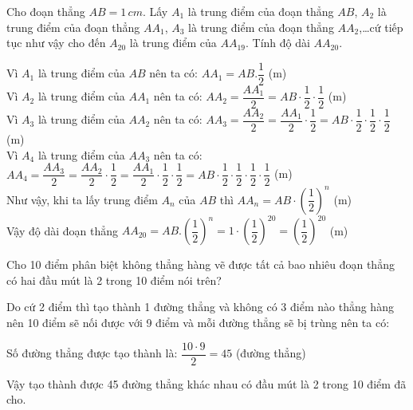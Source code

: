 \begin{bt}
	Cho đoạn thẳng $AB=1\,cm$. Lấy ${{A}_{1}}$ là trung điểm của đoạn thẳng $AB$, ${{A}_{2}}$ là trung điểm của đoạn thẳng $A{{A}_{1}}$, ${{A}_{3}}$ là trung điểm của đoạn thẳng $A{{A}_{2}}$,\ldots cứ tiếp tục như vậy cho đến ${{A}_{20}}$ là trung điểm của $A{{A}_{19}}$. Tính độ dài $A{{A}_{20}}$.
	\begin{loigiaichuong29}
		Vì ${{A}_{1}}$ là trung điểm của $AB$ nên ta có: $A{{A}_{1}}=AB.\dfrac{1}{2}$ (m)\\
		Vì ${{A}_{2}}$ là trung điểm của $A{{A}_{1}}$ nên ta có: $A{{A}_{2}}=\dfrac{A{{A}_{1}}}{2}=AB\cdot\dfrac{1}{2}\cdot\dfrac{1}{2}$ (m)\\
		Vì ${{A}_{3}}$ là trung điểm của $A{{A}_{2}}$ nên ta có: $A{{A}_{3}}=\dfrac{A{{A}_{2}}}{2}=\dfrac{A{{A}_{1}}}{2}\cdot\dfrac{1}{2}=AB\cdot\dfrac{1}{2}\cdot\dfrac{1}{2}\cdot\dfrac{1}{2}$ (m)\\
		Vì ${{A}_{4}}$ là trung điểm của $A{{A}_{3}}$ nên ta có: $A{{A}_{4}}=\dfrac{A{{A}_{3}}}{2}=\dfrac{A{{A}_{2}}}{2}\cdot\dfrac{1}{2}=\dfrac{A{{A}_{1}}}{2}\cdot\dfrac{1}{2}\cdot\dfrac{1}{2}=AB\cdot\dfrac{1}{2}\cdot\dfrac{1}{2}\cdot\dfrac{1}{2}\cdot\dfrac{1}{2}$ (m)\\
		Như vậy, khi ta lấy trung điểm ${{A}_{n}}$ của $AB$ thì $A{{A}_{n}}=AB\cdot{{ \left(\dfrac{1}{2} \right)}^{n}}$ (m)\\
		Vậy độ dài đoạn thẳng $A{{A}_{20}}=AB.{{\left(\dfrac{1}{2} \right)}^{n}}=1\cdot{{ \left(\dfrac{1}{2} \right)}^{20}}={{\left(\dfrac{1}{2} \right)}^{20}}$ (m)
	\end{loigiaichuong29}
\end{bt}
\begin{bt}
	Cho 10 điểm phân biệt không thẳng hàng vẽ được tất cả bao nhiêu đoạn thẳng có hai đầu mút là 2 trong 10 điểm nói trên?
	\begin{loigiaichuong29}
		Do cứ 2 điểm thì tạo thành 1 đường thẳng và không có 3 điểm nào thẳng hàng nên 10 điểm sẽ nối được với 9 điểm và mỗi đường thẳng sẽ bị trùng nên ta có: 
		
		Số đường thẳng được tạo thành là: $\dfrac{10 \cdot 9}{2}=45 $ (đường thẳng)
		
		Vậy tạo thành được 45 đường thẳng khác nhau có đầu mút là 2 trong 10 điểm đã cho.
	\end{loigiaichuong29}
\end{bt}
